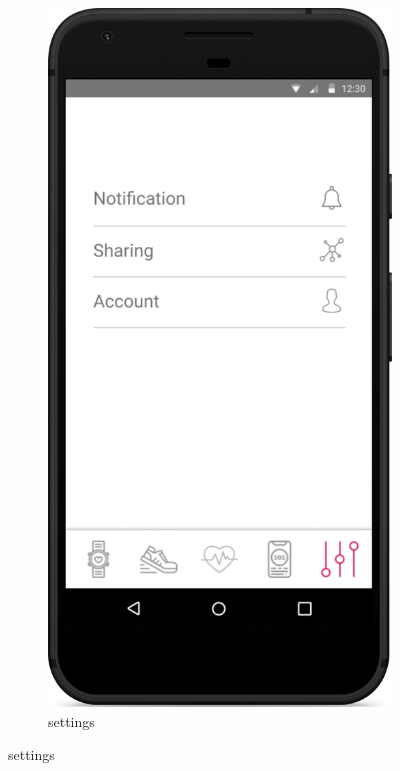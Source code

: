 \documentclass[../main.tex]{subfiles}
\begin{document}
\begin{figure}[H]
	\centering
	\begin{subfigure}[b]{0.45\linewidth}
		\includegraphics[width=\linewidth]{images/mockup/Settings.png}
		\caption{settings}

\end{subfigure}
\end{figure}
\end{document}
